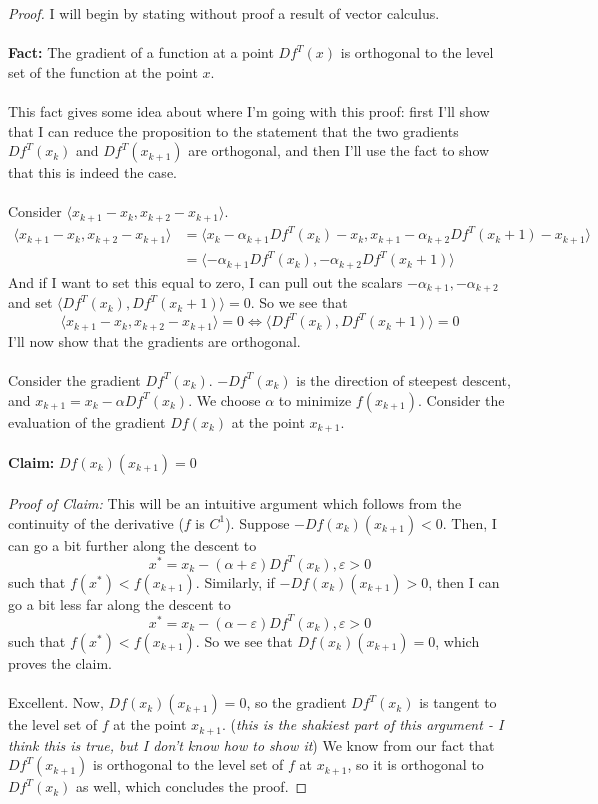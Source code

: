 \documentclass[12pt]{article}
\newenvironment{problem}[2][Problem]{\begin{trivlist}
\item[\hskip \labelsep {\bfseries #1}\hskip \labelsep {\bfseries #2.}]}{\end{trivlist}}
\theoremstyle{definition}
\theoremstyle{definition}
\theoremstyle{definition}
\theoremstyle{definition}
\begin{document}
\begin{problem}{9.5}
\begin{proof}
I will begin by stating without proof a result of vector calculus. \\
\\ 
\textbf{Fact:} The gradient of a function at a point $Df^T(x)$ is orthogonal to the level set of the function at the point $x$. \\
\\
This fact gives some idea about where I'm going with this proof: first I'll show that I can reduce the proposition to the statement that the two gradients $Df^T(x_k)$ and $Df^T(x_{k+1})$ are orthogonal, and then I'll use the fact to show that this is indeed the case. \\
\\
Consider $\langle x_{k+1} - x_{k}, x_{k+2} - x_{k+1} \rangle$.
\begin{align*}
\langle x_{k+1} - x_{k}, x_{k+2} - x_{k+1} \rangle &= \langle x_{k} - \alpha_{k+1} Df^T(x_k) - x_{k}, x_{k+1} - \alpha_{k+2} Df^T(x_k+1) - x_{k+1} \rangle \\
&= \langle -\alpha_{k+1} Df^T(x_k), - \alpha_{k+2} Df^T(x_k+1) \rangle
\end{align*}
And if I want to set this equal to zero, I can pull out the scalars $-\alpha_{k+1}, -\alpha_{k+2}$ and set $\langle Df^T(x_k), Df^T(x_k+1) \rangle = 0$. So we see that 
$$
\langle x_{k+1} - x_{k}, x_{k+2} - x_{k+1} \rangle = 0 \iff \langle Df^T(x_k), Df^T(x_k+1) \rangle = 0
$$ 
I'll now show that the gradients are orthogonal. \\
\\
Consider the gradient $Df^T(x_k)$. $-Df^T(x_k)$ is the direction of steepest descent, and $x_{k+1} = x_k - \alpha Df^T(x_k)$. We choose $\alpha$ to minimize $f(x_{k+1})$. Consider the evaluation of the gradient $Df(x_k)$ at the point $x_{k+1}$. \\
\\
\textbf{Claim:} $Df(x_k)(x_{k+1}) = 0$\\
\\
\textit{Proof of Claim:} This will be an intuitive argument which follows from the continuity of the derivative ($f$ is $C^1$). Suppose $-Df(x_k)(x_{k+1}) < 0$. Then, I can go a bit further along the descent to 
$$x^* = x_k - (\alpha + \varepsilon ) Df^T(x_k), \varepsilon > 0$$
such that $f(x^*) < f(x_{k+1})$. Similarly, if $-Df(x_k)(x_{k+1}) > 0$, then I can go a bit less far along the descent to 
$$x^* = x_k - (\alpha - \varepsilon) Df^T(x_k), \varepsilon > 0$$
such that $f(x^*) < f(x_{k+1})$. So we see that $Df(x_k)(x_{k+1}) = 0$, which proves the claim. \\
\\
Excellent. Now, $Df(x_k)(x_{k+1}) = 0$, so the gradient $Df^T(x_k)$ is tangent to the level set of $f$ at the point $x_{k+1}$. (\textit{this is the shakiest part of this argument - I think this is true, but I don't know how to show it}) We know from our fact that $Df^T(x_{k+1})$ is orthogonal to the level set of $f$ at $x_{k+1}$, so it is orthogonal to $Df^T(x_k)$ as well, which concludes the proof.
\end{proof}

\end{problem}
\end{document}
